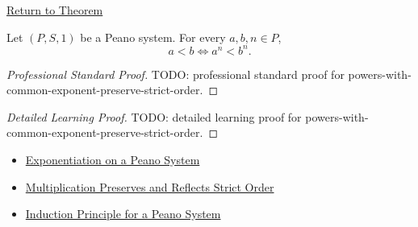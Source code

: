 \newpage
{}
\label{prf:powers-with-common-exponent-preserve-strict-order}

\begin{remark*}[Return]
\hyperref[thm:powers-with-common-exponent-preserve-strict-order]{Return to Theorem}
\end{remark*}

\begin{theorem*}
Let $(P,S,1)$ be a Peano system. For every $a,b,n \in P$,
\[
a<b
\Longleftrightarrow
a^n<b^n.
\]
\end{theorem*}

\begin{proof}[Professional Standard Proof]
\LRAProofBodyStart
TODO: professional standard proof for powers-with-common-exponent-preserve-strict-order.
\end{proof}

\begin{proof}[Detailed Learning Proof]
\LRAProofBodyStart
TODO: detailed learning proof for powers-with-common-exponent-preserve-strict-order.
\end{proof}

\begin{remark*}
\end{remark*}

\begin{dependencies}
\begin{itemize}
  \item \hyperref[def:exponentiation-on-peano-system]{Exponentiation on a Peano System}
  \item \hyperref[thm:multiplication-preserves-and-reflects-strict-order]{Multiplication Preserves and Reflects Strict Order}
  \item \hyperref[thm:induction-principle-for-peano-system]{Induction Principle for a Peano System}
\end{itemize}
\end{dependencies}

\clearpage
